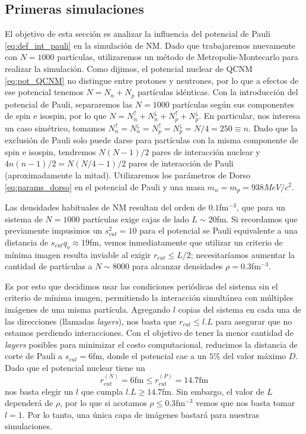 \subsection{Primeras simulaciones}

El objetivo de esta sección es analizar la influencia del potencial de Pauli \eqref{eq:def_int_pauli} en la simulación de NM. 
Dado que trabajaremos nuevamente con $N=1000$ partículas, utilizaremos un método de Metropolis-Montecarlo para realizar la simulación.
Como dijimos, el potencial nuclear de QCNM \eqref{eq:pot_QCNM} no distingue entre protones y neutrones, por lo que a efectos de ese potencial tenemos $N=N_n+N_p$ partículas idénticas.
Con la introducción del potencial de Pauli, separaremos las $N=1000$ partículas según sus componentes de spin e isospin, por lo que $N = N_n^\uparrow+N_n^\downarrow+N_p^\uparrow+N_p^\downarrow$.
En particular, nos interesa un caso simétrico, tomamos $N_n^\uparrow=N_n^\downarrow=N_p^\uparrow=N_p^\downarrow = N/4 = 250\equiv n$.
Dado que la exclusión de Pauli solo puede darse para partículas con la misma componente de spin e isospin, tendremos $N(N-1)/2$ pares de interacción nuclear y $4n(n-1)/2 = N(N/4-1)/2$ 
pares de interacción de Pauli (aproximadamente la mitad). 
Utilizaremos los parámetros de Dorso \eqref{eq:params_dorso} en el potencial de Pauli y una masa $m_n=m_p=938MeV/c^2$.

Las densidades habituales de NM resultan del orden de $0.1$fm$^{-3}$, que para un sistema de $N=1000$ partículas exige cajas de lado $L\sim 20$fm.
Si recordamos que previamente impusimos un $s_{cut}^2=10$ para el potencial se Pauli equivalente a una distancia de $s_{cut}q_o \approx 19$fm, vemos inmediatamente que utilizar un criterio de
mínima imagen resulta inviable al exigir $r_{cut}\leq L/2$; necesitaríamos aumentar la cantidad de partículas a $N\sim8000$ para alcanzar densidades $\rho=0.3$fm$^{-3}$.

Es por esto que decidimos usar las condiciones periódicas del sistema sin el criterio de mínima imagen, permitiendo la interacción simultánea con múltiples imágenes de una misma partícula.
Agregando $l$ copias del sistema en cada una de las direcciones (llamadas \textit{layers}), nos basta que $r_{cut}\leq l.L$ para asegurar que no estamos perdiendo interacciones.
Con el objetivo de tener la menor cantidad de \textit{layers} posibles para minimizar el costo computacional, reducimos la distancia de corte de Pauli a $s_{cut}=6$fm, donde el potencial cae a un $5\%$
del valor máximo $D$.
Dado que el potencial nuclear tiene un 
\[r_{cut}^{(N)} = 6\text{fm}\leq r_{cut}^{(P)} = 14.7\text{fm} \]
 nos basta elegir un $l$ que cumpla $l.L \geq 14.7$fm.
Sin embargo, el valor de $L$ dependerá de $\rho$, por lo que si acotamos $\rho\leq 0.3$fm$^{-3}$ vemos que nos basta tomar $l=1$.
Por lo tanto, una única capa de imágenes bastará para nuestras simulaciones.


